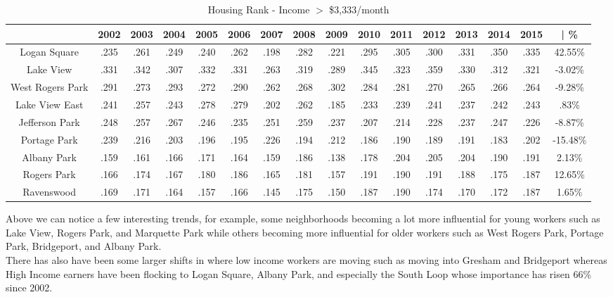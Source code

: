 \documentclass{article}
\theoremstyle{definition}
\theoremstyle{remark}
\begin{document}
\begin{table}[h]\centering
\caption{Housing Rank - Income $>$ \$3,333/month}\label{thelabel}
\begin{adjustbox}{center}
\begin{tabular}{||c | c c c c c c c c c c c c c c | c ||} 
 \hline
 & 2002 & 2003 & 2004 & 2005 & 2006 & 2007 & 2008 & 2009 & 2010 & 2011 & 2012 & 2013 & 2014 & 2015 & | \%\\[0.5ex] 
 \hline\hline
Logan Square & .235 & .261 & .249 & .240 & .262 & .198 & .282 & .221 & .295 & .305 & .300 & .331 & .350 & .335 & 42.55\% \\
Lake View & .331 & .342 & .307 & .332 & .331 & .263 & .319 & .289 & .345 & .323 & .359 & .330 & .312 & .321 & -3.02\% \\
West Rogers Park & .291 & .273 & .293 & .272 & .290 & .262 & .268 & .302 & .284 & .281 & .270 & .265 & .266 & .264 & -9.28\% \\
Lake View East & .241 & .257 & .243 & .278 & .279 & .202 & .262 & .185 & .233 & .239 & .241 & .237 & .242 & .243 & .83\% \\
Jefferson Park & .248 & .257 & .267 & .246 & .235 & .251 & .259 & .237 & .207 & .214 & .228 & .237 & .247 & .226 & -8.87\% \\
Portage Park & .239 & .216 & .203 & .196 & .195 & .226 & .194 & .212 & .186 & .190 & .189 & .191 & .183 & .202 & -15.48\% \\
Albany Park & .159 & .161 & .166 & .171 & .164 & .159 & .186 & .138 & .178 & .204 & .205 & .204 & .190 & .191 & 2.13\% \\
Rogers Park & .166 & .174 & .167 & .180 & .186 & .165 & .181 & .157 & .191 & .190 & .191 & .188 & .175 & .187 & 12.65\% \\
Ravenswood & .169 & .171 & .164 & .157 & .166 & .145 & .175 & .150 & .187 & .190 & .174 & .170 & .172 & .187 & 1.65\% \\ \end{tabular}
\end{adjustbox}
\end{table}

Above we can notice a few interesting trends, for example, some neighborhoods becoming a lot more influential for young workers such as Lake View, Rogers Park, and Marquette Park while others becoming more influential for older workers such as West Rogers Park, Portage Park, Bridgeport, and Albany Park. \\

There has also have been some larger shifts in where low income workers are moving such as moving into Gresham and Bridgeport whereas High Income earners have been flocking to Logan Square, Albany Park, and especially the South Loop whose importance has risen 66\% since 2002. \\
\end{document}
